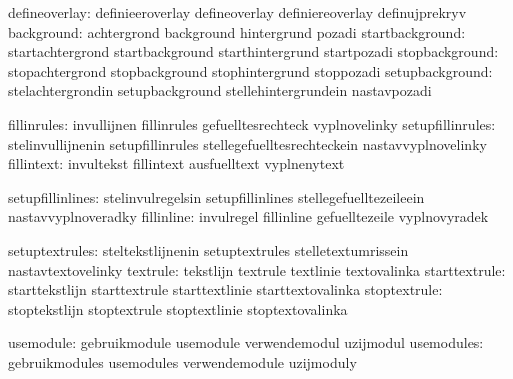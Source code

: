                 defineoverlay:  definieeroverlay             defineoverlay
                                definiereoverlay             definujprekryv
                   background:  achtergrond                  background
                                hintergrund                  pozadi
              startbackground:  startachtergrond             startbackground
                                starthintergrund             startpozadi
               stopbackground:  stopachtergrond              stopbackground
                                stophintergrund              stoppozadi
              setupbackground:  stelachtergrondin            setupbackground
                                stellehintergrundein         nastavpozadi

                  fillinrules:  invullijnen                  fillinrules
                                gefuelltesrechteck           vyplnovelinky %
             setupfillinrules:  stelinvullijnenin            setupfillinrules
                                stellegefuelltesrechteckein  nastavvyplnovelinky
                   fillintext:  invultekst                   fillintext
                                ausfuelltext                 vyplnenytext

             setupfillinlines:  stelinvulregelsin            setupfillinlines
                                stellegefuelltezeileein      nastavvyplnoveradky
                   fillinline:  invulregel                   fillinline
                                gefuelltezeile               vyplnovyradek

               setuptextrules:  steltekstlijnenin            setuptextrules
                                stelletextumrissein          nastavtextovelinky
                     textrule:  tekstlijn                    textrule
                                textlinie                    textovalinka
                starttextrule:  starttekstlijn               starttextrule
                                starttextlinie               starttextovalinka
                 stoptextrule:  stoptekstlijn                stoptextrule
                                stoptextlinie                stoptextovalinka

                    usemodule:  gebruikmodule                usemodule
                                verwendemodul                uzijmodul
                   usemodules:  gebruikmodules               usemodules
                                verwendemodule               uzijmoduly


